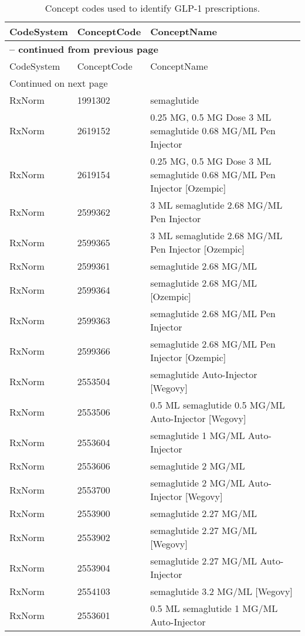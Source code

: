 \begin{longtable}{p{}p{}p{}}
\caption{Concept codes used to identify GLP-1 prescriptions.} \\ 
 CodeSystem & ConceptCode & ConceptName \\ 
  \hline 
\endfirsthead 
\multicolumn{3}{p{\textwidth}}{{ \bfseries \tablename \thetable{} -- continued from previous page}} \\ 
\hline CodeSystem & ConceptCode & ConceptName \\ \hline 
\endhead 
\hline \multicolumn{3}{p{\textwidth}}{{Continued on next page}} \\ \hline 
\endfoot 
\hline 
\endlastfoot 
 \hline
RxNorm & 1991302 & semaglutide \\ 
  RxNorm & 2619152 & 0.25 MG, 0.5 MG Dose 3 ML semaglutide 0.68 MG/ML Pen Injector \\ 
  RxNorm & 2619154 & 0.25 MG, 0.5 MG Dose 3 ML semaglutide 0.68 MG/ML Pen Injector [Ozempic] \\ 
  RxNorm & 2599362 & 3 ML semaglutide 2.68 MG/ML Pen Injector \\ 
  RxNorm & 2599365 & 3 ML semaglutide 2.68 MG/ML Pen Injector [Ozempic] \\ 
  RxNorm & 2599361 & semaglutide 2.68 MG/ML \\ 
  RxNorm & 2599364 & semaglutide 2.68 MG/ML [Ozempic] \\ 
  RxNorm & 2599363 & semaglutide 2.68 MG/ML Pen Injector \\ 
  RxNorm & 2599366 & semaglutide 2.68 MG/ML Pen Injector [Ozempic] \\ 
  RxNorm & 2553504 & semaglutide Auto-Injector [Wegovy] \\ 
  RxNorm & 2553506 & 0.5 ML semaglutide 0.5 MG/ML Auto-Injector [Wegovy] \\ 
  RxNorm & 2553604 & semaglutide 1 MG/ML Auto-Injector \\ 
  RxNorm & 2553606 & semaglutide 2 MG/ML \\ 
  RxNorm & 2553700 & semaglutide 2 MG/ML Auto-Injector [Wegovy] \\ 
  RxNorm & 2553900 & semaglutide 2.27 MG/ML \\ 
  RxNorm & 2553902 & semaglutide 2.27 MG/ML [Wegovy] \\ 
  RxNorm & 2553904 & semaglutide 2.27 MG/ML Auto-Injector \\ 
  RxNorm & 2554103 & semaglutide 3.2 MG/ML [Wegovy] \\ 
  RxNorm & 2553601 & 0.5 ML semaglutide 1 MG/ML Auto-Injector \\ 

\end{longtable}
